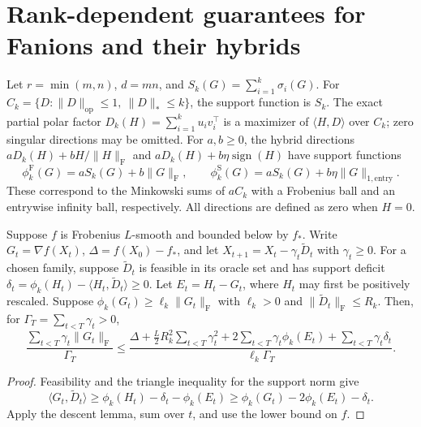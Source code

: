 
\section{Rank-dependent guarantees for Fanions and their hybrids}
\label{taf:section}

Let $r=\min(m,n)$, $d=mn$, and
$S_k(G)=\sum_{i=1}^k\sigma_i(G)$.
For $C_k=\{D:\|D\|_{\mathrm{op}}\leq1,\ \|D\|_*\leq k\}$,
the support function is $S_k$. The exact partial polar factor
$D_k(H)=\sum_{i=1}^k u_i v_i^\top$ is a maximizer of
$\langle H,D\rangle$ over $C_k$; zero singular directions may be omitted.
For $a,b\geq0$, the hybrid directions
$aD_k(H)+bH/\|H\|_{\mathrm F}$ and
$aD_k(H)+b\eta\operatorname{sign}(H)$ have support functions
\[
 \phi_k^{\mathrm F}(G)=aS_k(G)+b\|G\|_{\mathrm F},\qquad
 \phi_k^{\mathrm S}(G)=aS_k(G)+b\eta\|G\|_{1,\mathrm{entry}}.
\]
These correspond to the Minkowski sums of $aC_k$ with a Frobenius ball
and an entrywise infinity ball, respectively. All directions are defined
as zero when $H=0$.

\begin{theorem}
\label{taf:master}
Suppose $f$ is Frobenius $L$-smooth and bounded below by $f_*$.
Write $G_t=\nabla f(X_t)$, $\Delta=f(X_0)-f_*$, and let
$X_{t+1}=X_t-\gamma_t\widetilde D_t$ with $\gamma_t\geq0$.
For a chosen family, suppose $\widetilde D_t$ is feasible in its oracle
set and has support deficit
$\delta_t=\phi_k(H_t)-\langle H_t,\widetilde D_t\rangle\geq0$.
Let $E_t=H_t-G_t$, where $H_t$ may first be positively rescaled.
Suppose $\phi_k(G_t)\geq\ell_k\|G_t\|_{\mathrm F}$ with $\ell_k>0$ and
$\|\widetilde D_t\|_{\mathrm F}\leq R_k$.
Then, for $\Gamma_T=\sum_{t<T}\gamma_t>0$,
\begin{equation}\label{taf:bound}
 \frac{\sum_{t<T}\gamma_t\|G_t\|_{\mathrm F}}{\Gamma_T}
 \leq\frac{
 \Delta+\frac L2R_k^2\sum_{t<T}\gamma_t^2
 +2\sum_{t<T}\gamma_t\phi_k(E_t)
 +\sum_{t<T}\gamma_t\delta_t}{\ell_k\Gamma_T}.
\end{equation}
\end{theorem}
\begin{proof}
Feasibility and the triangle inequality for the support norm give
\[
 \langle G_t,\widetilde D_t\rangle
 \geq\phi_k(H_t)-\delta_t-\phi_k(E_t)
 \geq\phi_k(G_t)-2\phi_k(E_t)-\delta_t.
\]
Apply the descent lemma, sum over $t$, and use the lower bound on $f$.
\end{proof}

